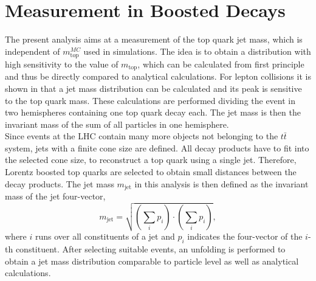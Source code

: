 \section{Measurement in Boosted Decays}
	The present analysis aims at a measurement of the top quark jet mass, which is independent of $m_\text{top}^{MC}$ used in simulations. The idea is to obtain a distribution with high sensitivity to the value of $m_\text{top}$, which can be calculated from first principle and thus be directly compared to analytical calculations. For lepton collisions it is shown in \cite{eejetmass} that a jet mass distribution can be calculated and its peak is sensitive to the top quark mass. These calculations are performed dividing the event in two hemispheres containing one top quark decay each. The jet mass is then the invariant mass of the sum of all particles in one hemisphere.\\
	Since events at the LHC contain many more objects not belonging to the $t\bar{t}$ system, jets with a finite cone size are defined. All decay products have to fit into the selected cone size, to reconstruct a top quark using a single jet. Therefore, Lorentz boosted top quarks are selected to obtain small distances between the decay products. The jet mass $m_\text{jet}$ in this analysis is then defined as the invariant mass of the jet four-vector,
	\begin{equation}
	m_\text{jet} = \sqrt{\left( \sum_{i} p_i \right) \cdot \left( \sum_{i} p_i \right)},
	\end{equation}
	where $i$ runs over all constituents of a jet and $p_i$ indicates the four-vector of the $i$-th constituent. After selecting suitable events, an unfolding is performed to obtain a jet mass distribution comparable to particle level as well as analytical calculations. 

